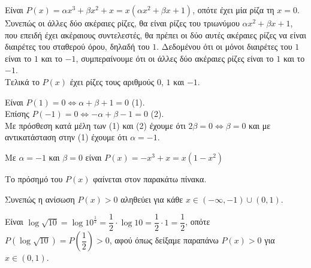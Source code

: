 \begin{alist}
\item Είναι $P(x) = \alpha x^3 + \beta x^2 + x = x(\alpha x^2 + \beta x + 1)$, οπότε έχει μία ρίζα τη $x = 0$. Συνεπώς οι άλλες δύο ακέραιες ρίζες, θα είναι ρίζες του τριωνύμου $\alpha x^2 + \beta x + 1$, που επειδή έχει ακέραιους συντελεστές, θα πρέπει οι δύο αυτές ακέραιες ρίζες να είναι διαιρέτες του σταθερού όρου, δηλαδή του $1$. Δεδομένου ότι οι μόνοι διαιρέτες του $1$ είναι το $1$ και το $-1$, συμπεραίνουμε ότι οι άλλες δύο ακέραιες ρίζες είναι το $1$ και το $-1$. \\
Τελικά το $P(x)$ έχει ρίζες τους αριθμούς $0$, $1$ και $-1$.
\item Είναι $P(1) = 0 \Leftrightarrow \alpha + \beta + 1 = 0$ (1). \\
Επίσης $P(-1) = 0 \Leftrightarrow -\alpha + \beta - 1 = 0$ (2). \\
Με πρόσθεση κατά μέλη των (1) και (2) έχουμε ότι $2\beta = 0 \Leftrightarrow \beta = 0$ και με αντικατάσταση στην (1) έχουμε ότι $\alpha = -1$.
\item Με $\alpha = -1$ και $\beta = 0$ είναι $P(x) = -x^3 + x = x(1-x^2)$
\begin{rlist}
\item Το πρόσημό του $P(x)$ φαίνεται στον παρακάτω πίνακα.
\begin{center}
\end{center}
Συνεπώς η ανίσωση $P(x) > 0$ αληθεύει για κάθε $x \in (-\infty, -1) \cup (0, 1)$.
\item Είναι $\log\sqrt{10} = \log 10^{\frac{1}{2}} = \dfrac{1}{2}\cdot\log 10 = \dfrac{1}{2}\cdot 1 = \dfrac{1}{2}$, οπότε $P(\log\sqrt{10}) = P\left(\dfrac{1}{2}\right) > 0$, αφού όπως δείξαμε παραπάνω $P(x) > 0$ για $x \in (0, 1)$.
\end{rlist}
\end{alist}

